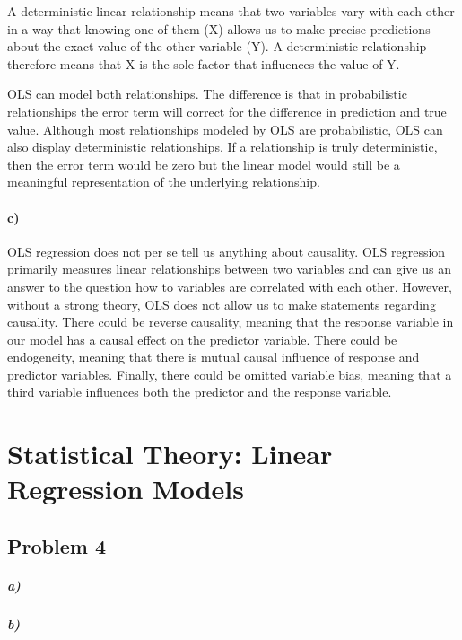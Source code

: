 \documentclass[12pt,letter]{article}\usepackage[]{graphicx}\usepackage[]{color}
\begin{document}
A deterministic linear relationship means that two variables vary with each other in a way that knowing one of them (X) allows us to make precise predictions about the exact value of the other variable (Y). A deterministic relationship therefore means that X is the sole factor that influences the value of Y.

OLS can model both relationships. The difference is that in probabilistic relationships the error term will correct for the difference in prediction and true value. Although most relationships modeled by OLS are probabilistic, OLS can also display deterministic relationships. If a relationship is truly deterministic, then the error term would be zero but the linear model would still be a meaningful representation of the underlying relationship.

\paragraph*{c)} OLS regression does not per se tell us anything about causality. OLS regression primarily measures linear relationships between two variables and can give us an answer to the question how to variables are correlated with each other. However, without a strong theory, OLS does not allow us to make statements regarding causality. There could be reverse causality, meaning that the response variable in our model has a causal effect on the predictor variable. There could be endogeneity, meaning that there is mutual causal influence of response and predictor variables. Finally, there could be omitted variable bias, meaning that a third variable influences both the predictor and the response variable.



\section*{Statistical Theory: Linear Regression Models}

\subsection*{Problem 4}

\subparagraph{a)}

\subparagraph{b)}
\end{document}
